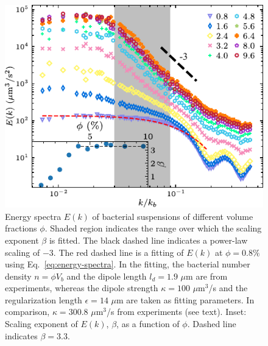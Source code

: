 \begin{figure}[!ht]
\begin{center}
\includegraphics[width=4.5in]{figs/5-GNF/5.pdf}
\caption[Energy Spectra in Active Turbulence]
{
Energy spectra $E(k)$ of bacterial suspensions of different volume fractions $\phi$. Shaded region indicates the range over which the scaling exponent $\beta$ is fitted. The black dashed line indicates a power-law scaling of $-3$. The red dashed line is a fitting of $E(k)$ at $\phi=0.8\%$ using Eq.~\ref{eq:energy-spectra}. In the fitting, the bacterial number density $n=\phi V_b$ and the dipole length $l_d = 1.9$ $\mu$m are from experiments, whereas the dipole strength $\kappa = 100$ $\mu$m$^3$/s and the regularization length $\epsilon = 14$ $\mu$m are taken as fitting parameters. In comparison, $\kappa = 300.8$ $\mu$m$^3$/s from experiments (see text).
Inset: Scaling exponent of $E(k)$, $\beta$, as a function of $\phi$. Dashed line indicates $\beta = 3.3$.
}
\label{fig:energy-spectra}
\end{center}
\end{figure}


